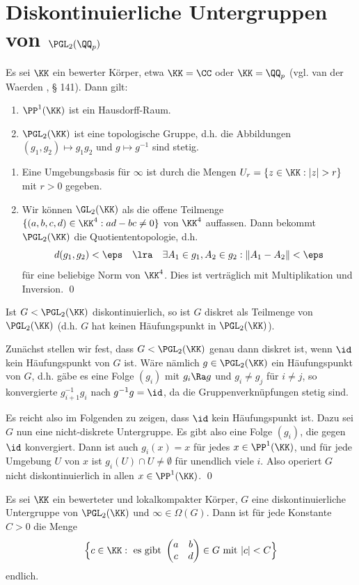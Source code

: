 \section{Diskontinuierliche Untergruppen von $\PGL_2(\QQ_p)$}\label{sec_disUG}

\BEM Es sei $\KK$ ein bewerter Körper, etwa $\KK=\CC$ oder $\KK=\QQ_p$ 
(vgl. van der Waerden \cite{vdW}, § 141).
Dann gilt:
\begin{enumerate}
\item $\PP^1(\KK)$ ist ein Hausdorff-Raum.
\item $\PGL_2(\KK)$ ist eine topologische Gruppe, d.h. die
Abbildungen $(g_1,g_2)\mapsto g_1 g_2$ und $g\mapsto g^{-1}$
sind stetig.
\end{enumerate}
\bew \begin{enumerate}
\item Eine Umgebungsbasis für $\infty$ ist durch die Mengen
$U_r=\{z\in\KK:|z|>r\}$ mit $r>0$ gegeben.
\item Wir können $\GL_2(\KK)$ als die offene Teilmenge
$\{(a,b,c,d)\in\KK^4 : ad-bc \neq 0 \}$ von $\KK^4$ auffassen.
Dann bekommt $\PGL_2(\KK)$ die Quotiententopologie, d.h.
\[
d(g_1,g_2) < \eps \quad \lra \quad
\exists A_1\in g_1, A_2\in g_2 :
\|A_1-A_2\| < \eps
\]
für eine beliebige Norm von $\KK^4$.
Dies ist verträglich mit Multiplikation und Inversion.
\qed
\end{enumerate}

\BEM\label{bem_diskret}
Ist $G<\PGL_2(\KK)$ diskontinuierlich, so ist $G$ diskret 
als Teilmenge von $\PGL_2(\KK)$ (d.h. $G$ hat keinen Häufungspunkt
in $\PGL_2(\KK)$).

\bew Zunächst stellen wir fest, dass $G<\PGL_2(\KK)$ genau dann
diskret ist, wenn $\id$ kein Häufungspunkt von $G$ ist. Wäre nämlich
$g\in\PGL_2(\KK)$ ein Häufungspunkt von $G$, d.h. gäbe es eine
Folge $(g_i)$ mit $g_i\Ra g$ und $g_i\neq g_j$ für $i\neq j$, so
konvergierte $g_{i+1}^{-1} g_i$ nach $g^{-1}g=\id$, da die
Gruppenverknüpfungen stetig sind.

Es reicht also im Folgenden zu zeigen, dass $\id$ kein Häufungspunkt
ist. Dazu sei $G$ nun eine nicht-diskrete Untergruppe.
Es gibt also eine Folge $(g_i)$, die gegen $\id$ konvergiert.
Dann ist auch $g_i(x)=x$ für jedes $x\in\PP^1(\KK)$, und für jede
Umgebung $U$ von $x$ ist $g_i(U)\cap U\neq\emptyset$ für unendlich
viele $i$. Also operiert $G$ nicht diskontinuierlich in allen
$x\in\PP^1(\KK)$.
\qed

\BEM\label{bem_lokalkompakt}
Es sei $\KK$ ein bewerteter und lokalkompakter Körper, $G$ eine
diskontinuierliche Untergruppe von $\PGL_2(\KK)$
und $\infty\in\Omega(G)$.
Dann ist für jede Konstante $C>0$ die Menge
\[
\Bigl\{ c\in\KK: \text{ es gibt }
\begin{pmatrix}
a & b \\ c & d
\end{pmatrix}\in G
\text{ mit }
|c|<C
\Bigr\}
\]
endlich.

